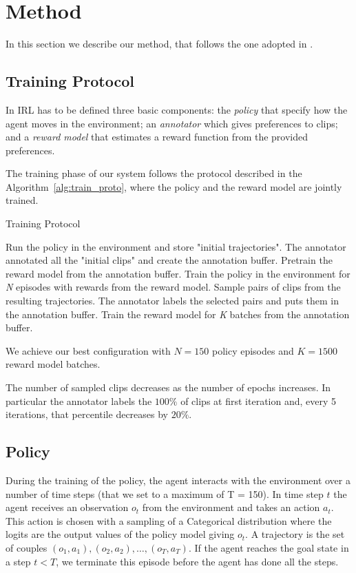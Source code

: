 \section{Method}\label{method}

In this section we describe our method, that follows the one adopted in \cite{NIPS2018_8025}.

\subsection{Training Protocol}\label{Alg}
In IRL has to be defined three basic components: the \textit{policy} that specify how the agent moves in the environment; an \textit{annotator} which gives preferences to clips; and a \textit{reward model} that estimates a reward function from the provided preferences. 

The training phase of our system follows the protocol described in the Algorithm\ \ref{alg:train_proto}, where the policy and the reward model are jointly trained.

\begin{algorithm}
\caption{Training Protocol}
\label{alg:train_proto}
\SetAlgoLined
\begin{algorithmic}[1]
\STATE Run the policy in the environment and store "initial trajectories".
\STATE The annotator annotated all the "initial clips" and create the annotation buffer.
\STATE Pretrain the reward model from the annotation buffer.
\STATE Train the policy in the environment for \textit{N} episodes with rewards from the reward model.
\STATE Sample pairs of clips from the resulting trajectories.
\STATE The annotator labels the selected pairs and puts them in the annotation buffer.
\STATE Train the reward model for \textit{K} batches from the annotation buffer.
\ENDFOR 
\end{algorithmic}
\end{algorithm}
 
We achieve our best configuration with $N=150$ policy episodes and $K=1500$ reward model batches. %

The number of sampled clips decreases as the number of epochs increases. In particular the annotator labels the $100\%$ of clips at first iteration and, every 5 iterations, that percentile decreases by $20\%$. 
\subsection{Policy}
During the training of the policy, the agent interacts with the environment over a number of time steps (that we set to a maximum of T = 150). In time step $t$ the agent receives an observation $o_t$ from the environment and takes an action $a_t$. This action is chosen with a sampling of a Categorical distribution where the logits are the output values of the policy model giving $o_t$. A trajectory is the set of couples ${(o_1, a_1), (o_2, a_2), \ldots, (o_T, a_T)}$. If the agent reaches the goal state in a step $\textit{t}<T$, we terminate this episode before the agent has done all the steps.

